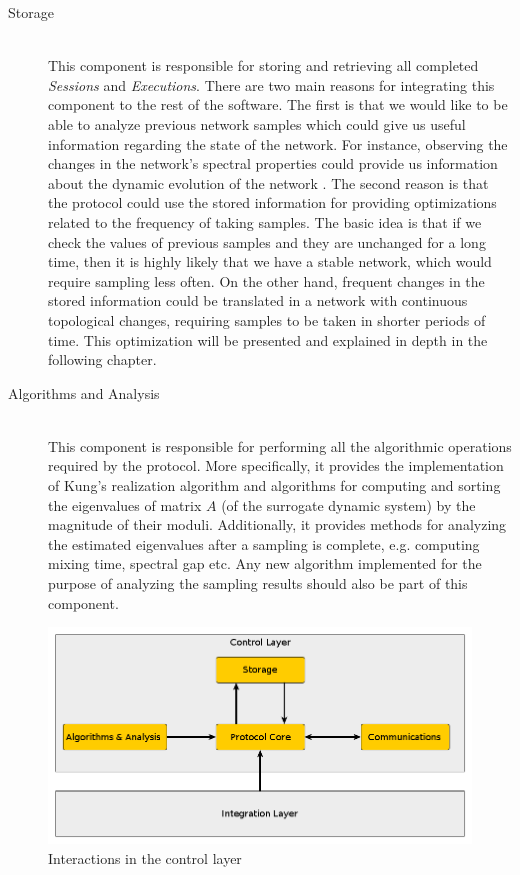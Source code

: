 \documentclass[a4paper,11pt,twoside]{report}
\begin{document}
\begin{description}
\item[Storage] \hfill \\
This component is responsible for storing and retrieving all completed \textit{Sessions} and \textit{Executions}. There are two main reasons for integrating this component to the rest of the software. The first is that we would like to be able to analyze previous network samples which could give us useful information regarding the state of the network. For instance, observing the changes in the network's spectral properties could provide us information about the dynamic evolution of the network \cite{kunegis2007spectral}. The second reason is that the protocol could use the stored information for providing optimizations related to the frequency of taking samples. The basic idea is that if we check the values of previous samples and they are unchanged for a long time, then it is highly likely that we have a stable network, which would require sampling less often. On the other hand, frequent changes in the stored information could be translated in a network with continuous topological changes, requiring samples to be taken in shorter periods of time. This optimization will be presented and explained in depth in the following chapter.
\item[Algorithms and Analysis] \hfill \\
This component is responsible for performing all the algorithmic operations required by the protocol. More specifically, it provides the implementation of Kung's realization algorithm and algorithms for computing and sorting the eigenvalues of matrix $A$ (of the surrogate dynamic system) by the magnitude of their moduli. Additionally, it provides methods for analyzing the estimated eigenvalues after a sampling is complete, e.g. computing mixing time, spectral gap etc. Any new algorithm implemented for the purpose of analyzing the sampling results should also be part of this component.

\end{description}

\begin{figure}
   \centering
     \includegraphics[scale=0.4]{../figures/network_agnostic.png}
	 \caption{Interactions in the control layer}
     \label{fig:network_agnostic_layer}
\end{figure}
\end{document}
